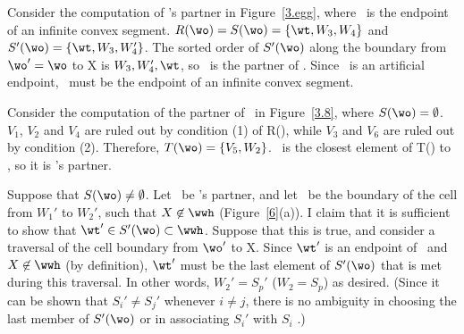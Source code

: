 \begin{example}
Consider the computation of \wo's partner in Figure~\ref{3.egg}, 
where \wo\ is the endpoint of an infinite convex segment.
\mbox{$R(\wo) = S(\wo) = \{\wt,W_{3},W_{4}\}$} and
\mbox{$S'(\wo) = \{\wt,W_{3},W_{4}'\}$}.
The sorted order of $S'(\wo)$ along the boundary from $\wo ' = \wo$ to X
is $W_{3},W_{4}',\wt$, so \wt\ is the partner of \wo.  
Since \wt\ is an artificial endpoint, \wo\ must be the endpoint of an 
infinite convex segment.


Consider the computation of the partner of \wo\ in Figure~\ref{3.8},
where $S(\wo) = \emptyset$.
$V_{1}$, $V_{2}$ and $V_{4}$ are ruled out by condition (1) of R(\wo),
while $V_{3}$ and $V_{6}$ are ruled out by condition (2).
Therefore, $T(\wo) = \{V_{5},W_{2}\}$.
\wt\ is the closest element of T(\wo) to \wo, so it is \wo's partner.
\end{example}


Suppose that $S(\wo) \neq \emptyset$.
Let \wt\ be \wo's partner, and let \wwh\ be the boundary of the cell 
from $W_{1}'$ to $W_{2}'$, such that $X \not\in \wwh$ (Figure~\ref{6}(a)).
%
%
I claim that it is sufficient to show that $\wt ' \in S'(\wo) \subset \wwh$.
Suppose that this is true, and consider a traversal of the cell boundary from
$\wo '$ to X. Since $\wt '$ is an endpoint of \wwh\ and
$X \not \in \wwh$ (by definition), $\wt '$ must be the last element of $S'(\wo)$ 
that is met during this traversal.
In other words, $W_{2}' = S_{p}'$ ($W_{2} = S_{p}$) as desired.
(Since it can be shown that $S_{i}' \neq S_{j}'$ whenever $i \neq j$, there 
is no ambiguity in choosing the last member of $S'(\wo)$ or in associating
$S_{i}'$ with $S_{i}$ \cite{jj}.)  %


